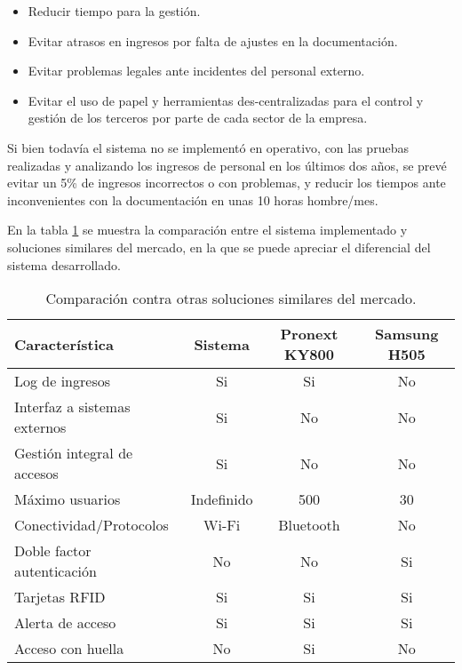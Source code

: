 \begin{itemize}
\item Reducir tiempo para la gestión.
\item Evitar atrasos en ingresos por falta de ajustes en la documentación.
\item Evitar problemas legales ante incidentes del personal externo.
\item Evitar el uso de papel y herramientas des-centralizadas para el control y gestión de los terceros por parte de cada sector de la empresa. 
\end{itemize}

Si bien todavía el sistema no se implementó en operativo, con las pruebas realizadas y analizando los ingresos de personal en los últimos dos años, se prevé evitar un 5\% de ingresos incorrectos o con problemas, y reducir los tiempos ante inconvenientes con la documentación en unas 10 horas hombre/mes.

En la tabla \ref{tab:comparacionfinal} se muestra la comparación entre el sistema implementado y soluciones similares del mercado, en la que se puede apreciar el diferencial del sistema desarrollado.


\begin{table}[h]
	\centering
	\caption[Comparación soluciones]{Comparación contra otras soluciones similares del mercado.}
	\begin{tabular}{l c c c}   
		\toprule
		\textbf{Característica} & 
		\textbf{Sistema } & 
		\textbf{Pronext KY800} &	
		\textbf{Samsung H505}    
		\\
		\midrule
		Log de ingresos  & Si  & Si & No \\		
		Interfaz a sistemas externos & Si & No & No \\		
		Gestión integral de accesos & Si & No & No \\		
		Máximo usuarios & Indefinido & 500  & 30  \\		
		Conectividad/Protocolos & Wi-Fi & Bluetooth & No  \\		
		Doble factor autenticación & No  & No & Si \\
		Tarjetas RFID  & Si  & Si  & Si \\
		Alerta de acceso  & Si & Si & Si \\
		Acceso con huella & No & Si & No \\
		\bottomrule
		\hline
	\end{tabular}
	\label{tab:comparacionfinal}
\end{table}

